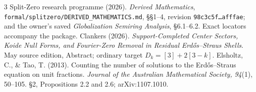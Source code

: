 \documentclass[10pt,a4paper]{article}
\begin{document}
\begin{thebibliography}{3}\small
{} Split-Zero research programme (2026).
\emph{Derived Mathematics}, \texttt{formal/splitzero/DERIVED\_MATHEMATICS.md},
\S\S1--4, revision \texttt{98c3c5f\ldots afffae}; and the owner's saved
\emph{Globalization Semiring Analysis}, \S6.1--6.2. Exact locators accompany the package.
 Clankers (2026). \emph{Support-Completed Center Sectors,
Koide Null Forms, and Fourier-Zero Removal in Residual Erd\H{o}s--Straus
Shells}. May source edition, Abstract; ordinary target $D_k=[3]+2[3-k]$.
 Elsholtz, C., \& Tao, T. (2013). Counting the number of solutions
to the Erd\H{o}s--Straus equation on unit fractions.
\emph{Journal of the Australian Mathematical Society, 94}(1), 50--105.
\S2, Propositions 2.2 and 2.6; arXiv:1107.1010.
\end{thebibliography}
\end{document}
